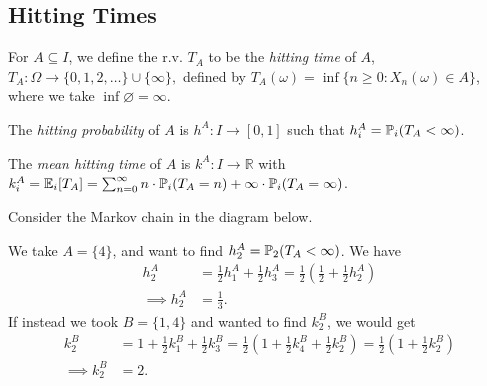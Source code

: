\documentclass[a4paper]{article}
\begin{document}
\subsection{Hitting Times}

\begin{definition}
	For $A \subseteq I$, we define the r.v. $T_A$ to be the \emph{hitting time} of $A$,
	$
	T_A: \Omega \rightarrow \{0, 1, 2, \dots \} \cup \{\infty\},
	$
	defined by $T_A(\omega) = \inf\{ n \ge 0: X_n(\omega) \in A\}$, where we take $\inf \varnothing = \infty$.

	The \emph{hitting probability} of $A$ is $h^A: I \rightarrow [0, 1]$ such that $h_i^A = {\mathbb{P}}_i(T_A < \infty)$.

	The \emph{mean hitting time} of $A$ is $k^A: I \rightarrow \mathbb{R} $ with $k_i^A = {\mathbb{E}}_i[T_A] = \sum_{n = 0}^{\infty} n \cdot {\mathbb{P}}_i(T_A = n) + \infty \cdot {\mathbb{P}}_i(T_A = \infty)$.
\end{definition}

\begin{example}
	Consider the Markov chain in the diagram below.
	\begin{center}
		\end{center}

		We take $A = \{4\}$, and want to find $h_2^A = {\mathbb{P}}_2(T_A < \infty)$. We have
		\begin{align*}
			h_2^A &= \frac{1}{2}h_1^A +
			\frac{1}{2}h_3^A =\frac{1}{2}\left( \frac{1}{2}+\frac{1}{2}h_2^A \right) \\
		\implies h_2^A &= \frac{1}{3}.
		\end{align*}
		If instead we took $B = \{1, 4\}$ and wanted to find $k_2^B$, we would get
		\begin{align*}
			k_2^B &= 1+\frac{1}{2}k_1^B+\frac{1}{2}k_3^B=\frac{1}{2}\left( 1+\frac{1}{2}k_4^B+\frac{1}{2}k_2^B \right)=\frac{1}{2}\left( 1+\frac{1}{2}k_2^B \right)\\
	\implies k_2^B &= 2.
		\end{align*}
\end{example}
\end{document}
